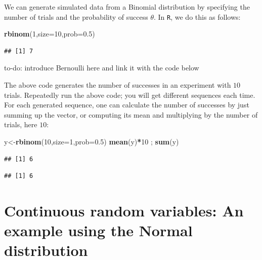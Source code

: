 \documentclass[12pt,]{krantz}
\makeatletter
\newenvironment{Shaded}{\begin{snugshade}}{\end{snugshade}}
\newcommand{\KeywordTok}[1]{\textcolor[rgb]{0.13,0.29,0.53}{\textbf{#1}}}
\newcommand{\DataTypeTok}[1]{\textcolor[rgb]{0.13,0.29,0.53}{#1}}
\newcommand{\DecValTok}[1]{\textcolor[rgb]{0.00,0.00,0.81}{#1}}
\newcommand{\FloatTok}[1]{\textcolor[rgb]{0.00,0.00,0.81}{#1}}
\newcommand{\OperatorTok}[1]{\textcolor[rgb]{0.81,0.36,0.00}{\textbf{#1}}}
\newcommand{\NormalTok}[1]{#1}
\newenvironment{kframe}{%
\medskip{}
\setlength{\fboxsep}{.8em}
 \def\at@end@of@kframe{}%
 \ifinner\ifhmode%
  \def\at@end@of@kframe{\end{minipage}}%
  \begin{minipage}{\columnwidth}%
 \fi\fi%
 \def\FrameCommand##1{\hskip\@totalleftmargin \hskip-\fboxsep
 \colorbox{shadecolor}{##1}\hskip-\fboxsep
     \hskip-\linewidth \hskip-\@totalleftmargin \hskip\columnwidth}%
 \MakeFramed {\advance\hsize-\width
   \@totalleftmargin\z@ \linewidth\hsize
   \@setminipage}}%
 {\par\unskip\endMakeFramed%
 \at@end@of@kframe}
\newenvironment{rmdblock}[1]
  {
  \begin{itemize}
  \renewcommand{\labelitemi}{
    \raisebox{-.7\height}[0pt][0pt]{
      {\setkeys{Gin}{width=3em,keepaspectratio}\texttt{[image: images/\#1]}}
    }
  }
  \setlength{\fboxsep}{1em}
  \begin{kframe}
  \item
  }
  {
  \end{kframe}
  \end{itemize}
  }
\newenvironment{rmdnote}
  {\begin{rmdblock}{note}}
  {\end{rmdblock}}
\theoremstyle{definition}
\theoremstyle{definition}
\theoremstyle{definition}
\theoremstyle{remark}
\makeatother
\begin{document}
We can generate simulated data from a Binomial distribution by
specifying the number of trials and the probability of success
\(\theta\). In \texttt{R}, we do this as follows:

\begin{Shaded}
\begin{Highlighting}[]
\KeywordTok{rbinom}\NormalTok{(}\DecValTok{1}\NormalTok{,}\DataTypeTok{size=}\DecValTok{10}\NormalTok{,}\DataTypeTok{prob=}\FloatTok{0.5}\NormalTok{)}
\end{Highlighting}
\end{Shaded}

\begin{verbatim}
## [1] 7
\end{verbatim}

\begin{rmdnote} to-do: introduce Bernoulli here and link it
with the code below \end{rmdnote}

The above code generates the number of successes in an experiment with
\(10\) trials. Repeatedly run the above code; you will get different
sequences each time. For each generated sequence, one can calculate the
number of successes by just summing up the vector, or computing its mean
and multiplying by the number of trials, here \(10\):

\begin{Shaded}
\begin{Highlighting}[]
\NormalTok{y<-}\KeywordTok{rbinom}\NormalTok{(}\DecValTok{10}\NormalTok{,}\DataTypeTok{size=}\DecValTok{1}\NormalTok{,}\DataTypeTok{prob=}\FloatTok{0.5}\NormalTok{)}
\KeywordTok{mean}\NormalTok{(y)}\OperatorTok{*}\DecValTok{10}\NormalTok{ ; }\KeywordTok{sum}\NormalTok{(y)}
\end{Highlighting}
\end{Shaded}

\begin{verbatim}
## [1] 6
\end{verbatim}

\begin{verbatim}
## [1] 6
\end{verbatim}

\section{Continuous random variables: An example using the Normal
distribution}\label{continuous-random-variables-an-example-using-the-normal-distribution}
\end{document}
